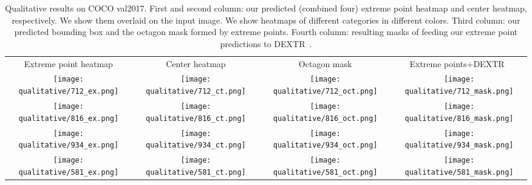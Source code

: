 \documentclass[10pt,twocolumn,letterpaper]{article}
\begin{document}
\begin{table*}
     \begin{center}
     \begin{tabular}{cccc}
     Extreme point heatmap & Center heatmap & Octagon mask & Extreme points+DEXTR~\cite{Man+18} \\
     \texttt{[image: qualitative/712\_ex.png]}
      &\texttt{[image: qualitative/712\_ct.png]}
      &\texttt{[image: qualitative/712\_oct.png]}
      &\texttt{[image: qualitative/712\_mask.png]} \\
     \texttt{[image: qualitative/816\_ex.png]}
      &\texttt{[image: qualitative/816\_ct.png]}
      &\texttt{[image: qualitative/816\_oct.png]}
      &\texttt{[image: qualitative/816\_mask.png]} \\
     \texttt{[image: qualitative/934\_ex.png]}
      &\texttt{[image: qualitative/934\_ct.png]}
      &\texttt{[image: qualitative/934\_oct.png]}
      &\texttt{[image: qualitative/934\_mask.png]} \\
     \texttt{[image: qualitative/581\_ex.png]}
      &\texttt{[image: qualitative/581\_ct.png]}
      &\texttt{[image: qualitative/581\_oct.png]}
      &\texttt{[image: qualitative/581\_mask.png]} \\
      \end{tabular}
      \caption{Qualitative results on COCO val2017. First and second column: our predicted (combined four) extreme point heatmap and center heatmap, respectively. We show them overlaid on the input image. We show heatmaps of different categories in different colors. Third column: our predicted bounding box and the octagon mask formed by extreme points. Fourth column: resulting masks of feeding our extreme point predictions to DEXTR~\cite{Man+18}.}
      \label{table:demo}
      \end{center}
\end{table*}
\end{document}
